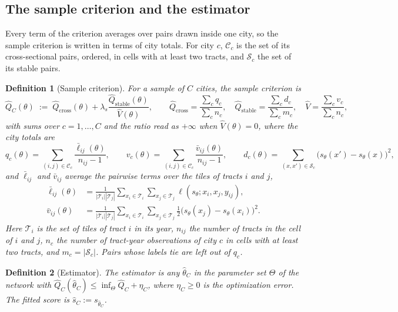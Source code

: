 \documentclass[11pt]{article}
\newtheorem{definition}{Definition}
\theoremstyle{remark}
\newcommand{\Qch}{\hat{Q}_{\mathrm{cross}}}
\newcommand{\Qsh}{\hat{Q}_{\mathrm{stable}}}
\newcommand{\Qth}{\hat{Q}}
\newcommand{\Cc}{\mathcal{C}}
\newcommand{\Ss}{\mathcal{S}}
\begin{document}
\subsection{The sample criterion and the estimator}\label{sec:sample}

Every term of the criterion averages over pairs drawn inside one city, so the sample criterion is
written in terms of city totals. For city $c$, $\Cc_c$ is the set of its cross-sectional pairs, ordered,
in cells with at least two tracts, and $\Ss_c$ the set of its stable pairs.

\begin{definition}[Sample criterion]\label{def:sample}
For a sample of $C$ cities, the \emph{sample criterion} is
\begin{equation}\label{eq:sampleloss}
    \Qth_C(\theta) \;:=\; \Qch(\theta) + \lambda_{s}\frac{\Qsh(\theta)}{\hat{V}(\theta)},
    \qquad
    \Qch = \frac{\sum_{c} q_c}{\sum_{c} n_c},
    \quad
    \Qsh = \frac{\sum_{c} d_c}{\sum_{c} m_c},
    \quad
    \hat{V} = \frac{\sum_{c} v_c}{\sum_{c} n_c},
\end{equation}
with sums over $c=1,\dots,C$ and the ratio read as $+\infty$ when $\hat V(\theta) = 0$, where the city
totals are
\[
    q_c(\theta) = \sum_{(i,j)\in\Cc_c} \frac{\bar\ell_{ij}(\theta)}{n_{ij}-1},
    \qquad
    v_c(\theta) = \sum_{(i,j)\in\Cc_c} \frac{\bar v_{ij}(\theta)}{n_{ij}-1},
    \qquad
    d_c(\theta) = \sum_{(x,x')\in\Ss_c} \big(s_\theta(x') - s_\theta(x)\big)^{2},
\]
and $\bar\ell_{ij}$ and $\bar v_{ij}$ average the pairwise terms over the tiles of tracts $i$ and $j$,
\begin{align*}
    \bar\ell_{ij}(\theta) &= \frac{1}{|\mathcal{T}_{i}||\mathcal{T}_{j}|}
        \sum_{x_i\in\mathcal{T}_{i}}\sum_{x_j\in\mathcal{T}_{j}} \ell(s_\theta; x_i, x_j, y_{ij}),\\
    \bar v_{ij}(\theta) &= \frac{1}{|\mathcal{T}_{i}||\mathcal{T}_{j}|}
        \sum_{x_i\in\mathcal{T}_{i}}\sum_{x_j\in\mathcal{T}_{j}} \tfrac12\big(s_\theta(x_j) - s_\theta(x_i)\big)^{2}.
\end{align*}
Here $\mathcal{T}_{i}$ is the set of tiles of tract $i$ in its year, $n_{ij}$ the number of tracts in the
cell of $i$ and $j$, $n_c$ the number of tract-year observations of city $c$ in cells with at least two
tracts, and $m_c = |\Ss_c|$. Pairs whose labels tie are left out of $q_c$.
\end{definition}

\begin{definition}[Estimator]\label{def:estimator}
The \emph{estimator} is any $\hat{\theta}_C$ in the parameter set $\Theta$ of the network with
$\Qth_C(\hat{\theta}_C) \le \inf_{\Theta}\Qth_C + \eta_C$, where $\eta_C \ge 0$ is the optimization
error. The fitted score is $\hat{s}_C := s_{\hat{\theta}_C}$.
\end{definition}
\end{document}
